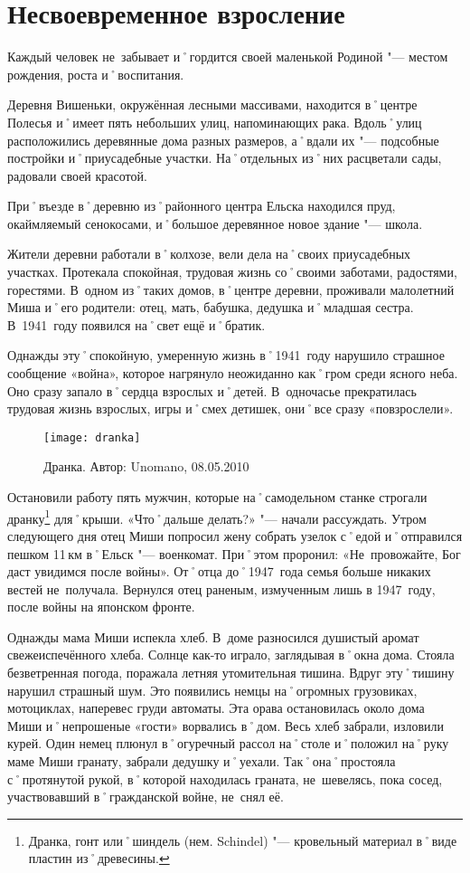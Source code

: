 ﻿\chapter{Несвоевременное взросление}
Каждый человек не~забывает и˚гордится своей маленькой Родиной "--- местом рождения, роста и˚воспитания.

Деревня Вишеньки, окружённая лесными массивами, находится в˚центре Полесья и˚имеет пять небольших улиц, напоминающих рака. Вдоль˚улиц расположились деревянные дома разных размеров, а˚вдали их "--- подсобные постройки и˚приусадебные участки. На˚отдельных из˚них расцветали сады, радовали своей красотой.

При˚въезде в˚деревню из˚районного центра Ельска находился пруд, окаймляемый сенокосами, и˚большое деревянное новое здание "--- школа.

Жители деревни работали в˚колхозе, вели дела на˚своих приусадебных участках. Протекала спокойная, трудовая жизнь со˚своими заботами, радостями, горестями. В~одном из˚таких домов, в˚центре деревни, проживали малолетний Миша и˚его родители: отец, мать, бабушка, дедушка и˚младшая сестра. В~1941~году появился на˚свет ещё и˚братик. 

Однажды эту˚спокойную, умеренную жизнь в˚1941~году нарушило страшное сообщение «война», которое нагрянуло неожиданно как˚гром среди ясного неба. Оно сразу запало в˚сердца взрослых и˚детей. В~одночасье прекратилась трудовая жизнь взрослых, игры и˚смех детишек, они˚все сразу «повзрослели». 

\begin{wrapfigure}{O}{.4\textwidth}
\centering
\texttt{[image: dranka]}
\caption{Дранка. Автор: Unomano, 08.05.2010}
\label{fig:dranka}
\end{wrapfigure}

Остановили работу пять мужчин, которые на˚самодельном станке строгали дранку\footnote{Дранка, гонт или˚шиндель (нем. Schindel) "--- кровельный материал в˚виде пластин из˚древесины.} для˚крыши. «Что˚дальше делать?» "--- начали рассуждать. Утром следующего дня отец Миши попросил жену собрать узелок с˚едой и˚отправился пешком 11\,км в˚Ельск "--- военкомат. При˚этом проронил: «Не~провожайте, Бог даст увидимся после войны». От˚отца до˚1947~года семья больше никаких вестей не~получала. Вернулся отец раненым, измученным лишь в 1947~году, после войны на японском фронте. 

Однажды мама Миши испекла хлеб. В~доме разносился душистый аромат свежеиспечённого хлеба. Солнце как-то играло, заглядывая в˚окна дома. Стояла безветренная погода, поражала летняя утомительная тишина. Вдруг эту˚тишину нарушил страшный шум. Это появились немцы на˚огромных грузовиках, мотоциклах, наперевес груди автоматы. Эта орава остановилась около дома Миши и˚непрошеные «гости» ворвались в˚дом. Весь хлеб забрали, изловили курей. Один немец плюнул в˚огуречный рассол на˚столе и˚положил на˚руку маме Миши гранату, забрали дедушку и˚уехали. Так˚она˚простояла с˚протянутой рукой, в˚которой находилась граната, не~шевелясь, пока сосед, участвовавший в˚гражданской войне, не~снял её.

